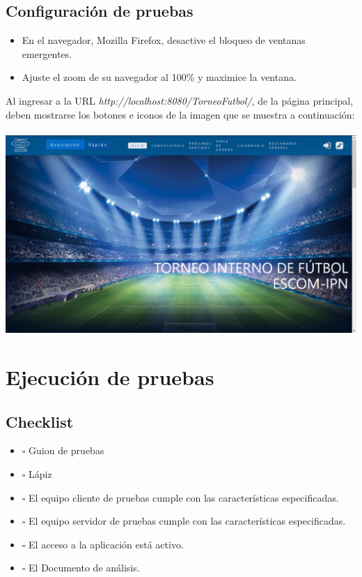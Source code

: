 \documentclass[oneside,10pt]{book}
\begin{document}
\section{Configuración de pruebas}

\begin{itemize}
\item En el navegador, Mozilla Firefox, desactive el bloqueo de ventanas emergentes.
\item Ajuste el zoom de su navegador al 100\% y maximice la ventana.
\end{itemize}

Al ingresar a la URL \textit{http://localhost:8080/TorneoFutbol/}, de la página principal, deben mostrarse los botones e iconos de la imagen que se muestra a continuación: \\ \\
\includegraphics[scale=.5]{images/index_sample}

\chapter{Ejecución de pruebas}

\section{Checklist}

\begin{itemize}
\item $\square$ Guion de pruebas
\item $\square$ Lápiz
\item $\square$ El equipo cliente de pruebas cumple con las características especificadas.
\item $\square$ El equipo servidor de pruebas cumple con las características especificadas.
\item $\square$ El acceso a la aplicación está activo.
\item $\square$ El Documento de análisis.
\end{itemize}
\end{document}
